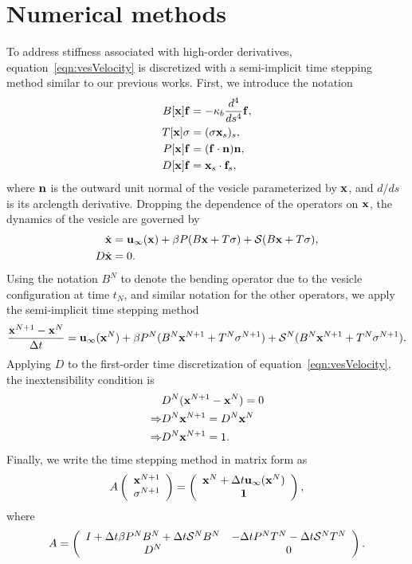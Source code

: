 \documentclass[twoside,twocolumn,9pt]{article}
\begin{document}
\section{Numerical methods}
To address stiffness associated with high-order derivatives,
equation~\eqref{eqn:vesVelocity} is discretized with a semi-implicit
time stepping method similar to our previous works.  First, we introduce
the notation
\begin{align}
  B[\mathbf{x}]\mathbf{f} &= -\kappa_b\frac{d^4}{ds^4} \mathbf{f}, \\
  T[\mathbf{x}]\sigma &= (\sigma \mathbf{x}_s)_s, \\
  P[\mathbf{x}]\mathbf{f} &= (\mathbf{f} \cdot \mathbf{n}) \mathbf{n}, \\
  D[\mathbf{x}]\mathbf{f} &= \mathbf{x}_s \cdot \mathbf{f}_s,
\end{align}
where $\mathbf{n}$ is the outward unit normal of the vesicle
parameterized by $\mathbf{x}$, and $d/ds$ is its arclength derivative.
Dropping the dependence of the operators on $\mathbf{x}$, the dynamics of the
vesicle are governed by
\begin{align}
  \dot{\mathbf{x}} &= \mathbf{u}_{\infty}(\mathbf{x}) + 
  \beta P(B\mathbf{x} + T\sigma) + \mathcal{S}(B\mathbf{x} + T\sigma), \\
  D \dot{\mathbf{x}} &= 0.
\end{align}
Using the notation $B^N$ to denote the bending operator due to the
vesicle configuration at time $t_N$, and similar notation for the other
operators, we apply the semi-implicit time stepping method
\begin{align}  
  \frac{\mathbf{x}^{N+1} - \mathbf{x}^N}{\Delta t} = \mathbf{u}_\infty(\mathbf{x}^N) 
  + \beta P^N(B^N\mathbf{x}^{N+1} + T^N\sigma^{N+1}) 
  + \mathcal{S}^N(B^N\mathbf{x}^{N+1} + T^N\sigma^{N+1}).
\end{align}
Applying $D$ to the first-order time discretization of
equation~\eqref{eqn:vesVelocity}, the inextensibility condition is
\begin{align*}
  &D^N(\mathbf{x}^{N+1} - \mathbf{x}^N) = 0 \\ 
  \Rightarrow &D^N\mathbf{x}^{N+1} = D^N \mathbf{x}^N \\ 
  \Rightarrow &D^N\mathbf{x}^{N+1} = 1.
\end{align*}
Finally, we write the time stepping method in matrix form as
\begin{align}
  A \left(
    \begin{array}{c}
      \mathbf{x}^{N+1} \\ \sigma^{N+1}
    \end{array}
  \right) = 
  \left(
    \begin{array}{c}
      \mathbf{x}^{N} + \Delta t \mathbf{u}_\infty(\mathbf{x}^N) \\ \mathbf{1}
    \end{array}
  \right),
\end{align}
where
\begin{align}
 A = \left(
  \begin{array}{cc}
    I + \Delta t \beta P^N B^N + \Delta t \mathcal{S}^N B^N & 
    -\Delta t P^N T^N - \Delta t \mathcal{S}^N T^N \\
    D^N & 0
  \end{array}
  \right).
\end{align}
\end{document}
